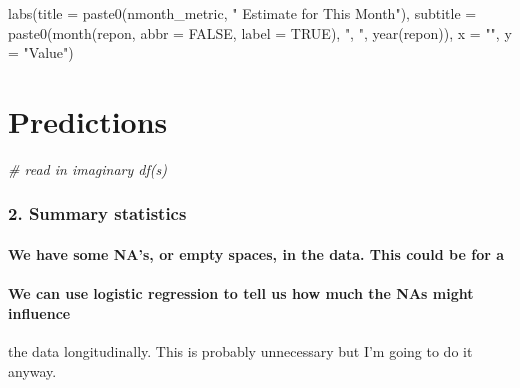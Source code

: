 \documentclass[
]{article}
\newenvironment{Shaded}{\begin{snugshade}}{\end{snugshade}}
\newcommand{\AttributeTok}[1]{\textcolor[rgb]{0.77,0.63,0.00}{#1}}
\newcommand{\CommentTok}[1]{\textcolor[rgb]{0.56,0.35,0.01}{\textit{#1}}}
\newcommand{\ConstantTok}[1]{\textcolor[rgb]{0.00,0.00,0.00}{#1}}
\newcommand{\FunctionTok}[1]{\textcolor[rgb]{0.00,0.00,0.00}{#1}}
\newcommand{\NormalTok}[1]{#1}
\newcommand{\StringTok}[1]{\textcolor[rgb]{0.31,0.60,0.02}{#1}}
\begin{document}
\begin{Shaded}
\begin{Highlighting}[]
  \FunctionTok{labs}\NormalTok{(}\AttributeTok{title =} \FunctionTok{paste0}\NormalTok{(nmonth\_metric, }\StringTok{" Estimate for This Month"}\NormalTok{),}
       \AttributeTok{subtitle =} \FunctionTok{paste0}\NormalTok{(}\FunctionTok{month}\NormalTok{(repon, }\AttributeTok{abbr =} \ConstantTok{FALSE}\NormalTok{, }\AttributeTok{label =} \ConstantTok{TRUE}\NormalTok{), }\StringTok{", "}\NormalTok{, }\FunctionTok{year}\NormalTok{(repon)),}
       \AttributeTok{x =} \StringTok{""}\NormalTok{,}
       \AttributeTok{y =} \StringTok{"Value"}\NormalTok{)}
\end{Highlighting}
\end{Shaded}

\hypertarget{predictions}{%
\section{Predictions}\label{predictions}}

\begin{Shaded}
\begin{Highlighting}[]
\CommentTok{\# read in imaginary df(s)}
\end{Highlighting}
\end{Shaded}

\hypertarget{summary-statistics}{%
\subsubsection{2. Summary statistics}\label{summary-statistics}}

\hypertarget{we-have-some-nas-or-empty-spaces-in-the-data.-this-could-be-for-a}{%
\paragraph{We have some NA's, or empty spaces, in the data. This could
be for
a}\label{we-have-some-nas-or-empty-spaces-in-the-data.-this-could-be-for-a}}

\hypertarget{we-can-use-logistic-regression-to-tell-us-how-much-the-nas-might-influence}{%
\paragraph{We can use logistic regression to tell us how much the NAs
might
influence}\label{we-can-use-logistic-regression-to-tell-us-how-much-the-nas-might-influence}}

the data longitudinally. This is probably unnecessary but I'm going to
do it anyway.
\end{document}
